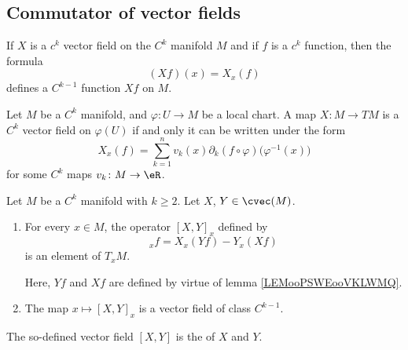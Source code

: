 \subsection{Commutator of vector fields}

\begin{lemma}       \label{LEMooPSWEooVKLWMQ}
    If \( X\) is a \( c^k\) vector field on the \( C^k\) manifold \( M\) and if \( f\) is a \( c^k\) function, then the formula
    \begin{equation}
        (Xf)(x)=X_x(f)
    \end{equation}
    defines a \( C^{k-1}\) function \( Xf\) on \( M\).
\end{lemma}

\begin{lemma}        \label{LEMooZWFAooDlYaJm}
    Let \( M\) be a \( C^k\) manifold, and \( \varphi\colon U\to M\) be a local chart. A map \( X\colon M\to TM\) is a \( C^k\) vector field on \( \varphi(U)\) if and only it can be written under the form
    \begin{equation}
        X_x(f)=\sum_{k=1}^nv_k(x)\partial_k(f\circ\varphi)\big( \varphi^{-1}(x) \big)
    \end{equation}
    for some \( C^k\) maps \( v_k\colon M\to \eR\).
\end{lemma}

\begin{propositionDef}      \label{DEFooHOTOooRaPwyo}
    Let \( M\) be a \( C^k\) manifold with \( k\geq 2\). Let $X$, $Y\in\cvec(M)$.
    \begin{enumerate}
        \item       \label{ITEMooZKKUooQjYftU}
    For every \( x\in M\), the operator \( [X,Y]_x\) defined by
    \begin{equation}
      [X,Y]_xf=X_x(Yf)-Y_x(Xf)
    \end{equation}
    is an element of \( T_xM\).

    Here, \( Yf\) and \( Xf\) are defined by virtue of lemma \ref{LEMooPSWEooVKLWMQ}.
\item       \label{ITEMooPGPLooQrKxWY}
    The map \( x\mapsto [X,Y]_x\) is a vector field of class \( C^{k-1}\).
    \end{enumerate}

    The so-defined vector field \( [X,Y]\) is the  of \( X\) and \( Y\).
\end{propositionDef}


